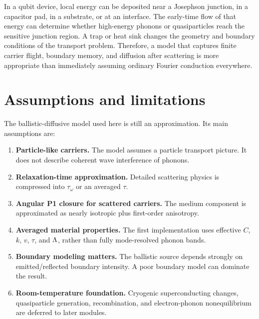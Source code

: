 \documentclass[11pt]{article}
\begin{document}
In a qubit device, local energy can be deposited near a Josephson junction, in a capacitor pad, in a substrate, or at an interface. The early-time flow of that energy can determine whether high-energy phonons or quasiparticles reach the sensitive junction region. A trap or heat sink changes the geometry and boundary conditions of the transport problem. Therefore, a model that captures finite carrier flight, boundary memory, and diffusion after scattering is more appropriate than immediately assuming ordinary Fourier conduction everywhere.

\section{Assumptions and limitations}
The ballistic-diffusive model used here is still an approximation. Its main assumptions are:
\begin{enumerate}[leftmargin=1.6em]
    \item \textbf{Particle-like carriers.} The model assumes a particle transport picture. It does not describe coherent wave interference of phonons.
    \item \textbf{Relaxation-time approximation.} Detailed scattering physics is compressed into \(\tau_\omega\) or an averaged \(\tau\).
    \item \textbf{Angular P1 closure for scattered carriers.} The medium component is approximated as nearly isotropic plus first-order anisotropy.
    \item \textbf{Averaged material properties.} The first implementation uses effective \(C\), \(k\), \(v\), \(\tau\), and \(\Lambda\), rather than fully mode-resolved phonon bands.
    \item \textbf{Boundary modeling matters.} The ballistic source depends strongly on emitted/reflected boundary intensity. A poor boundary model can dominate the result.
    \item \textbf{Room-temperature foundation.} Cryogenic superconducting changes, quasiparticle generation, recombination, and electron-phonon nonequilibrium are deferred to later modules.
\end{enumerate}
\end{document}
